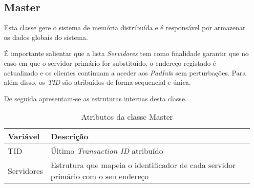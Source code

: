 \subsection{Master}

Esta classe gere o sistema de memória distribuída e é responsável por armazenar os dados globais do sistema.

É importante salientar que a lista \textit{Servidores} tem como finalidade garantir que no caso em que o servidor primário for substituído, o endereço registado é actualizado e os clientes continuam a aceder aos \textit{PadInt}s sem perturbações. Para além disso, os \textit{TID} são atribuídos de forma sequencial e única. 

De seguida apresentam-se as estruturas internas desta classe.
\begin{table}[H]
\centering
\begin{tabular}{| p{2cm} | p{5cm} |}
\hline
\textbf{Variável} & \textbf{Descrição} \\
\hline
TID & Último \textit{Transaction ID} atribuído \\
\hline
Servidores & Estrutura que mapeia o identificador de cada servidor primário com o seu endereço \\
\hline
\end{tabular}
\caption{Atributos da classe Master}
\end{table}
